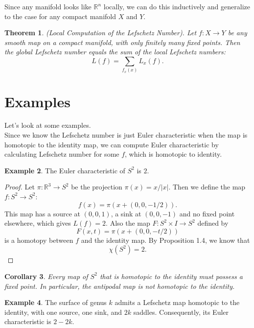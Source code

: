 \documentclass[psamsfonts]{amsart}
\newtheorem{theorem}{Theorem}[section]
\newtheorem{cor}[theorem]{Corollary}
\theoremstyle{definition}
\newtheorem{exmp}[theorem]{Example}
\theoremstyle{remark}
\numberwithin{equation}{section}
\begin{document}
		Since any manifold looks like $\mathbb{R}^n$ locally, we can do this inductively and generalize to the case for any compact manifold $X$ and $Y$.						\begin{theorem}(Local Computation of the Lefschetz Number).
			Let $f:X \to Y$ be any smooth map on a compact manifold, with only finitely many fixed points. Then the global Lefschetz number equals the sum of the local Lefschetz numbers:
			\begin{equation}
				L(f) = \sum_{f_x(x)}L_x(f).
			\end{equation}
			
		\end{theorem}
		
	\section{Examples}
		Let's look at some examples.\\
		\indent Since we know the Lefschetz number is just Euler characteristic when the map is homotopic to the identity map, we can compute Euler characteristic by calculating Lefschetz number for some $f$, which is homotopic to identity.
		\begin{exmp}
			The Euler characteristic of $S^2$ is $2$.
		\end{exmp}
		\begin{proof}
			Let $\pi : \mathbb{R}^3 \to S^2$ be the projection $\pi (x) = x/|x|$. Then we define the map $f: S^2 \to S^2$:
			\begin{equation}
				f(x) = \pi (x+(0,0,-1/2)).
			\end{equation}
			This map has a source at $(0,0,1)$, a sink at $(0,0,-1)$ and no fixed point elsewhere, which gives $L(f) = 2$. Also the map $F: S^2 \times I \to S^2$ defined by
			\begin{equation}
				F(x,t) = \pi (x+(0,0,-t/2))
			\end{equation}
			is a homotopy between $f$ and the identity map. By Proposition 1.4, we know that 
			\begin{equation}
				\chi (S^2) = 2.
			\end{equation}
		\end{proof}					
		
		\begin{cor}
			Every map of $S^2$ that is homotopic to the identity must possess a fixed point. In particular, the antipodal map is not homotopic to the identity.
		\end{cor}
		\begin{exmp}
			The surface of genus $k$ admits a Lefschetz map homotopic to the identity, with one source, one sink, and $2k$ saddles. Consequently, its Euler characteristic is $2-2k$.
		\end{exmp}
		
\end{document}
